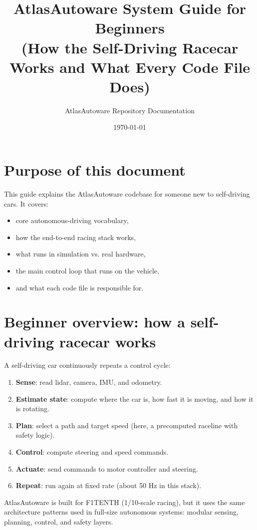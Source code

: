 \documentclass[11pt]{article}
\title{AtlasAutoware System Guide for Beginners\\
(How the Self-Driving Racecar Works and What Every Code File Does)}
\author{AtlasAutoware Repository Documentation}
\date{\today}
\begin{document}
\maketitle
\tableofcontents
\newpage

\section{Purpose of this document}
This guide explains the AtlasAutoware codebase for someone new to self-driving cars.
It covers:
\begin{itemize}
  \item core autonomous-driving vocabulary,
  \item how the end-to-end racing stack works,
  \item what runs in simulation vs. real hardware,
  \item the main control loop that runs on the vehicle,
  \item and what each code file is responsible for.
\end{itemize}

\section{Beginner overview: how a self-driving racecar works}
A self-driving car continuously repeats a control cycle:
\begin{enumerate}
  \item \textbf{Sense}: read lidar, camera, IMU, and odometry.
  \item \textbf{Estimate state}: compute where the car is, how fast it is moving, and how it is rotating.
  \item \textbf{Plan}: select a path and target speed (here, a precomputed raceline with safety logic).
  \item \textbf{Control}: compute steering and speed commands.
  \item \textbf{Actuate}: send commands to motor controller and steering.
  \item \textbf{Repeat}: run again at fixed rate (about 50 Hz in this stack).
\end{enumerate}

AtlasAutoware is built for F1TENTH (1/10-scale racing), but it uses the same architecture patterns used in full-size autonomous systems: modular sensing, planning, control, and safety layers.
\end{document}
